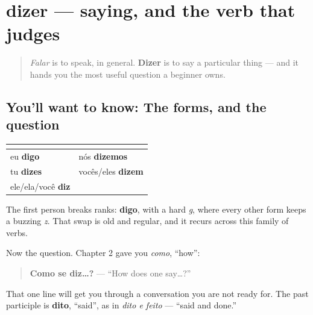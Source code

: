 \section[dizer]{dizer — saying, and the verb that judges}

\label{lesson:PT-C18-dizer}



\begin{quote}
\emph{Falar} is to speak, in general. \textbf{Dizer} is to say a particular thing — and it hands you the most useful question a beginner owns.
\end{quote}

\subsection*{You'll want to know: The forms, and the question}
\noindent
\begin{tabularx}{\linewidth}{@{}>{\raggedright\arraybackslash}X>{\raggedright\arraybackslash}X@{}}
\toprule
\textbf{} & \textbf{} \\
\midrule
eu \textbf{digo} & nós \textbf{dizemos} \\
tu \textbf{dizes} & vocês/eles \textbf{dizem} \\
ele/ela/você \textbf{diz} &  \\
\bottomrule
\end{tabularx}

The first person breaks ranks: \textbf{digo}, with a hard \emph{g}, where every other form keeps a buzzing \emph{z}. That swap is old and regular, and it recurs across this family of verbs.

Now the question. Chapter 2 gave you \emph{como}, \textquotedblleft{}how\textquotedblright{}:

\begin{quote}
\textbf{Como se diz…?} — \textquotedblleft{}How does one say…?\textquotedblright{}
\end{quote}

That one line will get you through a conversation you are not ready for. The past participle is \textbf{dito}, \textquotedblleft{}said\textquotedblright{}, as in \emph{dito e feito} — \textquotedblleft{}said and done.\textquotedblright{}


